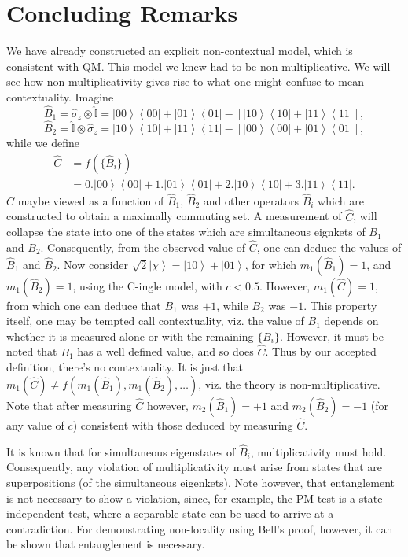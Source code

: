 \documentclass[british,aps,prl,superscriptaddress,nofootinbib,times,reprint]{revtex4-1}
\theoremstyle{plain}
\theoremstyle{definition}
\theoremstyle{remark}
\theoremstyle{remark}
\theoremstyle{remark}
\theoremstyle{plain}
\theoremstyle{plain}
\theoremstyle{plain}
\theoremstyle{definition}
\theoremstyle{definition}
\begin{document}
\section{Concluding Remarks
\label{sec:implications}} We have already
constructed an explicit non-contextual model,
which is consistent with QM.  This model we knew
had to be non-multiplicative.  We will see how
non-multiplicativity gives rise to what one might
confuse to mean contextuality.  Imagine \[
\hat{B}_{1}=\hat{\sigma}_{z}\otimes\hat{\mathbb{I}}=\left|00\right\rangle
\left\langle 00\right|+\left|01\right\rangle
\left\langle 01\right|-\left[\left|10\right\rangle
\left\langle 10\right|+\left|11\right\rangle
\left\langle 11\right|\right], \] \[
\hat{B}_{2}=\hat{\mathbb{I}}\otimes\hat{\sigma}_{z}=\left|10\right\rangle
\left\langle 10\right|+\left|11\right\rangle
\left\langle 11\right|-\left[\left|00\right\rangle
\left\langle 00\right|+\left|01\right\rangle
\left\langle 01\right|\right], \] while we define
\begin{align*} \hat{C}&=f(\{\hat{B}_{i}\}) \\
&=0.\left|00\right\rangle \left\langle
00\right|+1.\left|01\right\rangle \left\langle
01\right|+2.\left|10\right\rangle \left\langle
10\right|+3.\left|11\right\rangle \left\langle
11\right|.  \end{align*} $\hat{C}$ maybe viewed as
a function of $\hat{B}_{1}$, $\hat{B}_{2}$ and
other operators $\hat{B}_{i}$ which are
constructed to obtain a maximally commuting set. A
measurement of $\hat{C}$, will collapse the state
into one of the states which are simultaneous
eignkets of $B_{1}$ and $B_{2}$. Consequently,
from the observed value of $\hat{C}$, one can
deduce the values of $\hat{B}_{1}$ and
$\hat{B}_{2}$. Now consider
$\sqrt{2}\left|\chi\right\rangle
=\left|10\right\rangle +\left|01\right\rangle $,
for which $m_{1}(\hat{B}_{1})=1$, and
$m_{1}(\hat{B}_{2})=1$, using the C-ingle model,
with $c<0.5$. However, $m_{1}(\hat{C})=1$, from
which one can deduce that $B_{1}$ was $+1$, while
$B_{2}$ was $-1$.  This property itself, one may
be tempted call contextuality, viz.  the value of
$B_{1}$ depends on whether it is measured alone or
with the remaining $\{B_{i}\}$. However, it must
be noted that $B_{1}$ has a well defined value,
and so does $\hat{C}$. Thus by our accepted
definition, there's no contextuality. It is just
that $m_{1}(\hat{C})\neq
f(m_{1}(\hat{B}_{1}),m_{1}(\hat{B}_{2}),\dots)$,
viz. the theory is non-multiplicative. Note that
after measuring $\hat{C}$ however,
$m_{2}(\hat{B}_{1})=+1$ and
$m_{2}(\hat{B}_{2})=-1$ (for any value of $c$)
consistent with those deduced by measuring
$\hat{C}$.


It is known that for simultaneous eigenstates of
$\hat{B}_{i}$, multiplicativity must hold.
Consequently, any violation of multiplicativity
must arise from states that are superpositions (of
the simultaneous eigenkets).  Note however, that
entanglement is not necessary to show a violation,
since, for example, the PM test is a state
independent test, where a separable state can be
used to arrive at a contradiction. For
demonstrating non-locality using Bell's proof,
however, it can be shown that entanglement is
necessary.  

\end{document}
